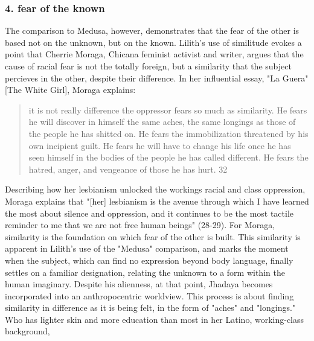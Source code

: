 \documentclass[11pt]{article}
\begin{document}
\subsubsection{4. fear of the known}
\label{sec:org5b62916}
The comparison to Medusa, however, demonstrates that the fear of the
other is based not on the unknown, but on the known. Lilith's use of
similitude evokes a point that Cherrie Moraga, Chicana feminist
activist and writer, argues that the cause of racial fear is not the
totally foreign, but a similarity that the subject percieves in the
other, despite their difference. In her influential essay, "La Guera"
[The White Girl], Moraga explains:
\begin{quote}
it is not really difference the oppressor fears so much as
similarity. He fears he will discover in himself the same aches, the
same longings as those of the people he has shitted on. He fears the
immobilization threatened by his own incipient guilt. He fears he will
have to change his life once he has seen himself in the bodies of the
people he has called different. He fears the hatred, anger, and
vengeance of those he has hurt. 32
\end{quote}
Describing how her lesbianism unlocked the workings racial and class
oppression, Moraga explains that "[her] lesbianism is the avenue
through which I have learned the most about silence and oppression,
and it continues to be the most tactile reminder to me that we are not
free human beings" (28-29). For Moraga, similarity is the foundation
on which fear of the other is built. This similarity is apparent in
Lilith's use of the "Medusa" comparison, and marks the moment when the
subject, which can find no expression beyond body language, finally
settles on a familiar designation, relating the unknown to a form
within the human imaginary. Despite his alienness, at that point,
Jhadaya becomes incorporated into an anthropocentric worldview. This
process is about finding similarity in difference as it is being felt,
in the form of "aches" and "longings." Who has lighter skin and more
education than most in her Latino, working-class background,
\end{document}
